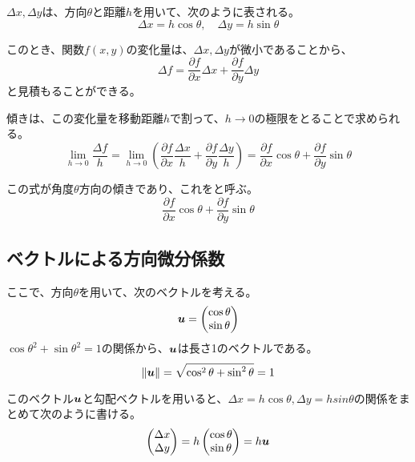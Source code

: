 \documentclass[../../../topic_calculus]{subfiles}
\begin{document}
$\Delta x, \Delta y$は、方向$\theta$と距離$h$を用いて、次のように表される。
\begin{equation*}
  \Delta x = h \cos \theta , \quad
  \Delta y = h \sin \theta
\end{equation*}

このとき、関数$f(x,y)$の変化量は、$\Delta x, \Delta y$が微小であることから、
\begin{equation*}
  \Delta f = \frac{\partial f}{\partial x}\Delta x + \frac{\partial f}{\partial y}\Delta y
\end{equation*}
と見積もることができる。

\br

傾きは、この変化量を移動距離$h$で割って、$h \to 0$の極限をとることで求められる。
\begin{equation*}
  \lim_{h \to 0} \frac{\Delta f}{h}
= \lim_{h \to 0} \left( \frac{\partial f}{\partial x}\frac{\Delta x}{h} + \frac{\partial f}{\partial y}\frac{\Delta y}{h} \right)
= \frac{\partial f}{\partial x}\cos \theta + \frac{\partial f}{\partial y}\sin \theta
\end{equation*}

\br

この式が角度$\theta$方向の傾きであり、これをと呼ぶ。
\begin{equation*}
  \frac{\partial f}{\partial x}\cos \theta + \frac{\partial f}{\partial y}\sin \theta
\end{equation*}

\subsection{ベクトルによる方向微分係数}

ここで、方向$\theta$を用いて、次のベクトルを考える。
\begin{equation*}
  \vb*{u} = \begin{pmatrix} \cos \theta \\ \sin \theta \end{pmatrix}
\end{equation*}
$\cos \theta^2 + \sin \theta^2 = 1$の関係から、$\vb*{u}$は長さ1のベクトルである。
\begin{equation*}
  \| \vb*{u} \| = \sqrt{\cos^2 \theta + \sin^2 \theta} = 1
\end{equation*}

\br

このベクトル$\vb*{u}$と勾配ベクトルを用いると、$\Delta x = h \cos \theta ,\Delta y = h sin \theta$の関係をまとめて次のように書ける。
\begin{equation*}
  \begin{pmatrix} \Delta x \\ \Delta y \end{pmatrix} = h \begin{pmatrix} \cos \theta \\ \sin \theta \end{pmatrix} = h \vb*{u}
\end{equation*}
\end{document}
